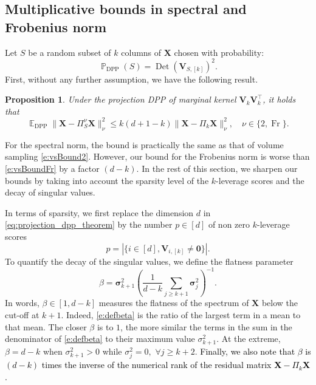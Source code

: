 \documentclass[twoside,11pt]{book}
\newcommand{\rev}[1]{\textcolor{black}{#1}}
\newtheorem{proposition}{Proposition}
\numberwithin{theorem}{chapter}
\numberwithin{definition}{chapter}
\numberwithin{proposition}{chapter}
\numberwithin{corollary}{chapter}
\numberwithin{example}{chapter}
\numberwithin{lemma}{chapter}
\numberwithin{assumption}{chapter}
\numberwithin{equation}{chapter}
\numberwithin{figure}{chapter}
\DeclareMathOperator{\Det}{Det}
\DeclareMathOperator{\Fr}{\mathrm{Fr}}
\DeclareMathOperator{\DPP}{\mathrm{DPP}}
\DeclareMathOperator{\Tran}{\intercal}
\DeclareMathOperator{\EX}{\mathbb{E}}
\DeclareMathOperator{\Prb}{\mathbb{P}}
\begin{document}
\subsection{Multiplicative bounds in spectral and Frobenius norm}
\label{sec:new_results_randomized}
Let $S$ be a random subset of $k$ columns of $\bm{X}$ chosen with probability:
\begin{equation}
	\Prb_{\DPP}(S) = \Det(\bm{V}_{S,[k]})^{2}.
\end{equation}
First, without any further assumption, we have the following result.
\begin{proposition}
    \label{projection_dpp_theorem}
    Under the projection DPP of marginal kernel $\bm{V}^{}_{k}\bm{V}^{\Tran}_{k}$, it holds that
    \begin{equation}
    	\label{eq:projection_dpp_theorem}
    	\EX_{\DPP} \| \bm{X} - \Pi_{S}^{\nu}\bm{X} \|_{\nu}^{2} \leq k(d+1-k)\| \bm{X} - \Pi_{k}\bm{X} \|_{\nu}^{2}, \quad \nu\in\{2,\Fr\}.
    \end{equation}
\end{proposition}
For the spectral norm, the bound is practically the same as that of volume sampling \eqref{e:vsBound2}. However, our bound for the Frobenius norm is worse than \eqref{e:vsBoundFr} by a factor $(d-k)$. In the rest of this section, we sharpen our bounds by taking into account the sparsity level of the $k$-leverage scores and the decay of singular values.

In terms of sparsity, we first replace the dimension $d$ in \eqref{eq:projection_dpp_theorem} by the number $p\in[d]$ of non zero $k$-leverage scores
\begin{equation}
  p = \left| \{i \in [d], \bm{V}_{i,[k]} \neq \bm{0}\}\right|.
  \label{e:defp}
\end{equation}
To quantify the decay of the singular values, we define the flatness parameter
\begin{equation}
  \beta = \bm{\sigma}_{k+1}^{2} \left(\frac{1}{d-k} \sum\limits_{j \geq k+1} \bm{\sigma}_{j}^{2}\right)^{-1}.
  \label{e:defbeta}
\end{equation}
In words, $\beta\in[1,d-k]$ measures the flatness of the spectrum of $\bm{X}$ below the cut-off at $k+1$. Indeed, \eqref{e:defbeta} is the ratio of the largest term in a mean to that mean. The closer $\beta$ is to $1$, the more similar the terms in the sum in the denominator of \eqref{e:defbeta} to their maximum value $\sigma_{k+1}^{2}$. At the extreme, $\beta=d-k$ when $\sigma^2_{k+1}>0$ while $\sigma_j^2=0,$ $\forall j\geq k+2$. \rev{Finally, we also note that $\beta$ is $(d-k)$ times the inverse of the numerical rank \parencite{RuVe07} of the residual matrix $\bm{X}-\Pi_{k}\bm{X}$.}
\end{document}
